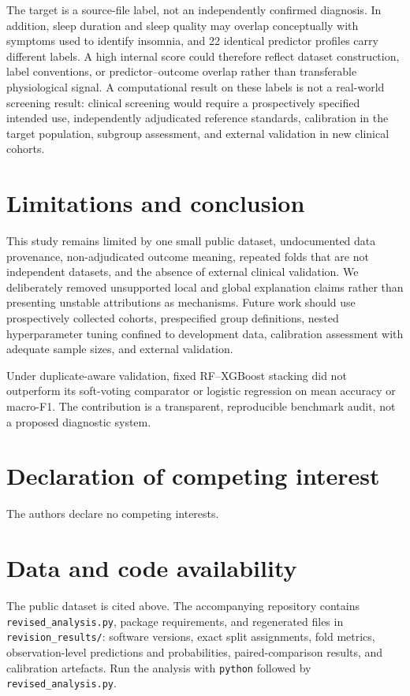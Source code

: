 \documentclass[preprint,12pt]{elsarticle}
\begin{document}
The target is a source-file label, not an independently confirmed diagnosis. In addition, sleep duration and sleep quality may overlap conceptually with symptoms used to identify insomnia, and 22 identical predictor profiles carry different labels. A high internal score could therefore reflect dataset construction, label conventions, or predictor--outcome overlap rather than transferable physiological signal. A computational result on these labels is not a real-world screening result: clinical screening would require a prospectively specified intended use, independently adjudicated reference standards, calibration in the target population, subgroup assessment, and external validation in new clinical cohorts.

\section{Limitations and conclusion}

This study remains limited by one small public dataset, undocumented data provenance, non-adjudicated outcome meaning, repeated folds that are not independent datasets, and the absence of external clinical validation. We deliberately removed unsupported local and global explanation claims rather than presenting unstable attributions as mechanisms. Future work should use prospectively collected cohorts, prespecified group definitions, nested hyperparameter tuning confined to development data, calibration assessment with adequate sample sizes, and external validation.

Under duplicate-aware validation, fixed RF--XGBoost stacking did not outperform its soft-voting comparator or logistic regression on mean accuracy or macro-F1. The contribution is a transparent, reproducible benchmark audit, not a proposed diagnostic system.

\section*{Declaration of competing interest}
The authors declare no competing interests.

\section*{Data and code availability}
The public dataset is cited above. The accompanying repository contains \texttt{revised\_analysis.py}, package requirements, and regenerated files in \texttt{revision\_results/}: software versions, exact split assignments, fold metrics, observation-level predictions and probabilities, paired-comparison results, and calibration artefacts. Run the analysis with \texttt{python} followed by \texttt{revised\_analysis.py}.



\end{document}
